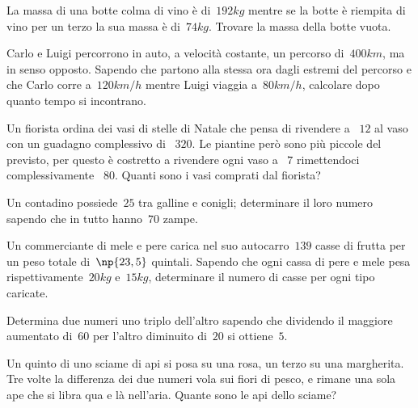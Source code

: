 \begin{multicols}{2}
\begin{esercizio}[\Ast, \croce]
La massa di una botte colma di vino è di~$192\unit{kg}$ mentre se la botte è riempita di vino per un terzo la sua massa è di~$74\unit{kg}$. Trovare la massa della botte vuota.
\end{esercizio}

\begin{esercizio}[\Ast, \croce]
Carlo e Luigi percorrono in auto, a velocità costante, un percorso di~$400\unit{km}$, ma in senso opposto. Sapendo che partono alla stessa ora dagli estremi del percorso e che Carlo corre a~$120\unit{km/h}$ mentre Luigi viaggia a~$80\unit{km/h}$, calcolare dopo quanto tempo si incontrano.
\end{esercizio}

\begin{esercizio}[\Ast, \croce]
Un fiorista ordina dei vasi di stelle di Natale che pensa di rivendere a \officialeuro~$12$ al vaso con un guadagno complessivo di \officialeuro~$320$. Le piantine però sono più piccole del previsto, per questo è costretto a rivendere ogni vaso a \officialeuro~$7$ rimettendoci complessivamente \officialeuro~$80$. Quanti sono i vasi comprati dal fiorista?
\end{esercizio}

\begin{esercizio}[\Ast, \croce]
Un contadino possiede~$25$ tra galline e conigli; determinare il loro numero sapendo che in tutto hanno~$70$ zampe.
\end{esercizio}

\begin{esercizio}[\Ast, \croce]
Un commerciante di mele e pere carica nel suo autocarro~$139$ casse di frutta per un peso totale di~$\np{23,5}$ quintali. Sapendo che ogni cassa di pere e mele pesa rispettivamente~$20\unit{kg}$ e~$15\unit{kg}$, determinare il numero di casse per ogni tipo caricate.
\end{esercizio}

\begin{esercizio}[\Ast, \croce]
Determina due numeri uno triplo dell'altro sapendo che dividendo il maggiore aumentato di~$60$ per l'altro diminuito di~$20$ si ottiene~$5$.
\end{esercizio}

\begin{esercizio}[\Ast, \croce]
Un quinto di uno sciame di api si posa su una rosa, un terzo su una margherita. Tre volte la differenza dei due numeri vola sui fiori di pesco, e rimane una sola ape che si libra qua e là nell'aria. Quante sono le api dello sciame?
\end{esercizio}


\end{multicols}
